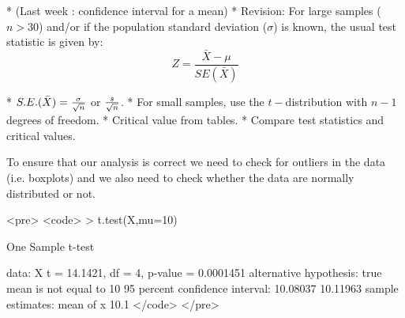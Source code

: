 \begin{itemize}
	* (Last week : confidence interval for a mean) * Revision:
	For large samples ($n > 30$) and/or if the population standard
	deviation ($\sigma$) is known, the usual test statistic is given
	by: \[Z =\frac{\bar{X} - \mu}{SE(\bar{X})}\]
	
	* $S.E.(\bar{X}) = { \sigma \over \sqrt{n}} $ or ${s \over \sqrt{n}}$. 
	* For small samples, use the $t-$distribution with $n-1$ degrees of freedom.
	* Critical value from tables.
	* Compare test statistics and critical values.
\end{itemize}

To ensure that our analysis is correct we need to check for
outliers in the data (i.e. boxplots) and we also need to check
whether the data are normally distributed or not.

<pre>
	<code>
	> t.test(X,mu=10)
	
	One Sample t-test
	
	data:  X 
	t = 14.1421, df = 4, p-value = 0.0001451
	alternative hypothesis: true mean is not equal to 10 
	95 percent confidence interval:
	10.08037 10.11963 
	sample estimates:
	mean of x 
	10.1 
	</code>
</pre>





